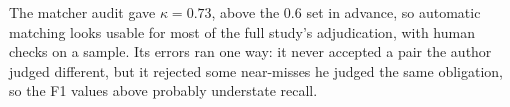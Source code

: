 The matcher audit gave $\kappa=0.73$, above the 0.6 set in advance, so automatic matching looks usable for most of the full study's adjudication, with human checks on a sample. Its errors ran one way: it never accepted a pair the author judged different, but it rejected some near-misses he judged the same obligation, so the F1 values above probably understate recall.%
